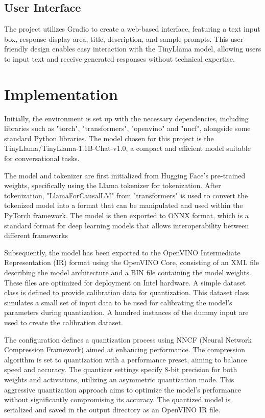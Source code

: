\documentclass{josis}
\begin{document}
\subsection{User Interface}
\begin{enumerate}
The project utilizes Gradio to create a web-based interface, featuring a text input box, response display area, title, description, and sample prompts. This user-friendly design enables easy interaction with the TinyLlama model, allowing users to input text and receive generated responses without technical expertise.
\end{enumerate}


\section{Implementation}
Initially, the environment is set up with the necessary dependencies, including libraries such as "torch", "transformers", "openvino" and "nncf", alongside some standard Python libraries. The model chosen for this project is the TinyLlama/TinyLlama-1.1B-Chat-v1.0, a compact and efficient model suitable for conversational tasks.

The model and tokenizer are first initialized from Hugging Face's pre-trained weights, specifically using the Llama tokenizer for tokenization. After tokenization, "LlamaForCausalLM" from "transformers" is used to convert the tokenized model into a format that can be manipulated and used within the PyTorch framework. The model is then exported to ONNX format, which is a standard format for deep learning models that allows interoperability between different frameworks

Subsequently, the model has been exported to the OpenVINO Intermediate Representation (IR) format using the OpenVINO Core, consisting of an XML file describing the model architecture and a BIN file containing the model weights. These files are optimized for deployment on Intel hardware. A simple dataset class is defined to provide calibration data for quantization. This dataset class simulates a small set of input data to be used for calibrating the model's parameters during quantization. A hundred instances of the dummy input are used to create the calibration dataset.

The configuration defines a quantization process using NNCF (Neural Network Compression Framework) aimed at enhancing performance. The compression algorithm is set to quantization with a performance preset, aiming to balance speed and accuracy. The quantizer settings specify 8-bit precision for both weights and activations, utilizing an asymmetric quantization mode. This aggressive quantization approach aims to optimize the model's performance without significantly compromising its accuracy. The quantized model is serialized and saved in the output directory as an OpenVINO IR file. 
\end{document}
